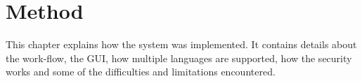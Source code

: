 \chapter{Method}
This chapter explains how the system was implemented. It contains details about the work-flow, the GUI, how multiple languages are supported, how the security works and some of the difficulties and limitations encountered.







